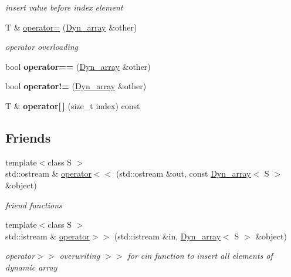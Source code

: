 \begin{DoxyCompactItemize}
\begin{DoxyCompactList}\small\item\em insert value before index element \end{DoxyCompactList}\item 
\mbox{\label{classDyn__array_a3038b3c6558794e168a7a5d7f58a3701}} 
T \& \hyperlink{classDyn__array_a3038b3c6558794e168a7a5d7f58a3701}{operator=} (\hyperlink{classDyn__array}{Dyn\+\_\+array} \&other)
\begin{DoxyCompactList}\small\item\em operator overloading \end{DoxyCompactList}\item 
\mbox{\label{classDyn__array_a28a167f80e6fc521b554d4593fb34fed}} 
bool {\bfseries operator==} (\hyperlink{classDyn__array}{Dyn\+\_\+array} \&other)
\item 
\mbox{\label{classDyn__array_aa8b85bba86c621693fab80fd9f8d18bc}} 
bool {\bfseries operator!=} (\hyperlink{classDyn__array}{Dyn\+\_\+array} \&other)
\item 
\mbox{\label{classDyn__array_ad0a2b07ac0796bec497173998c25a279}} 
T \& {\bfseries operator\mbox{[}$\,$\mbox{]}} (size\+\_\+t index) const
\end{DoxyCompactItemize}
\subsection*{Friends}
\begin{DoxyCompactItemize}
\item 
{\footnotesize template$<$class S $>$ }\\std\+::ostream \& \hyperlink{classDyn__array_aebc2873551e997f690220158398e5bf3}{operator$<$$<$} (std\+::ostream \&out, const \hyperlink{classDyn__array}{Dyn\+\_\+array}$<$ S $>$ \&object)
\begin{DoxyCompactList}\small\item\em friend functions \end{DoxyCompactList}\item 
{\footnotesize template$<$class S $>$ }\\std\+::istream \& \hyperlink{classDyn__array_a3b9156ade0a68fef20fc21e06aed9cc0}{operator$>$$>$} (std\+::istream \&in, \hyperlink{classDyn__array}{Dyn\+\_\+array}$<$ S $>$ \&object)
\begin{DoxyCompactList}\small\item\em operator$>$$>$ overwriting $>$$>$ for cin function to insert all elements of dynamic array \end{DoxyCompactList}\end{DoxyCompactItemize}


